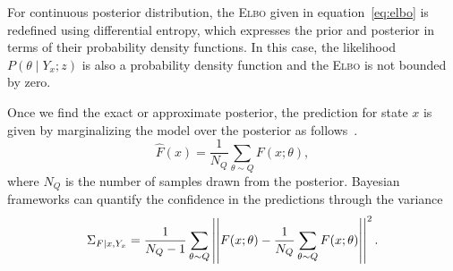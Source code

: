 \begin{rem}
  For continuous posterior distribution, the \textsc{Elbo} given in
  equation~\eqref{eq:elbo} is redefined using differential entropy, which
  expresses the prior and posterior in terms of their probability density
  functions. In this case, the likelihood $P(\theta \mid Y_x;z)$ is also
  a probability density function and the \textsc{Elbo} is not bounded by zero.
\end{rem}


Once we find the exact or approximate posterior, the prediction for state $x$ is
given by marginalizing the model over the posterior as
follows~\cite{jospin2020hands}.
\begin{equation}
  \hat{F}(x) = \frac{1}{N_Q} \sum_{\theta \sim Q} F(x; \theta),
  \label{eqn:marginalization}
\end{equation} 
where $N_Q$ is the number of samples drawn from the posterior. Bayesian
frameworks can quantify the confidence in the predictions through the
variance~\cite{jospin2020hands}
\begin{equation}
  \Sigma_{F \mid x,Y_x} = \frac{1}{N_Q-1} \sum_{\theta \sim Q} \left|\left|F(x; \theta) - \frac{1}{N_Q} \sum_{\theta \sim Q} F(x; \theta)\right|\right|^2.
  \label{eqn:predictive_variance}
\end{equation}
%
